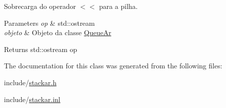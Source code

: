 Sobrecarga do operador $<$$<$ para a pilha. 


\begin{DoxyParams}{Parameters}
{\em op} & std\+::ostream \\
\hline
{\em objeto} & Objeto da classe \hyperlink{class_queue_ar}{Queue\+Ar} \\
\hline
\end{DoxyParams}
\begin{DoxyReturn}{Returns}
std\+::ostream op 
\end{DoxyReturn}


The documentation for this class was generated from the following files\+:\begin{DoxyCompactItemize}
\item 
include/\hyperlink{stackar_8h}{stackar.\+h}\item 
include/\hyperlink{stackar_8inl}{stackar.\+inl}\end{DoxyCompactItemize}
